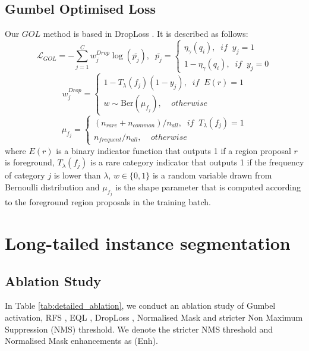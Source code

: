 \documentclass[runningheads]{llncs}
\begin{document}
\subsection{Gumbel Optimised Loss}
Our $GOL$ method is based in DropLoss \cite{hsieh2021droploss}. It is described as follows:
\begin{equation}
    \mathcal{L}_{GOL} = -\sum_{j=1}^{C}w_j^{Drop}\log(\bar{p_j}),\;\; \bar{p_j}=\begin{cases}
         \eta_{\gamma}(q_i),\;\; if \;\;  y_j=1\\
         1-\eta_{\gamma}(q_i),\;\;  if\;\;  y_j=0
        \end{cases}
\end{equation}
\begin{equation}
    w_j^{Drop}=\begin{cases}
         1- T_{\lambda}(f_j)(1-y_j),\;\; if \;\;  E(r)=1\\
         w \sim \text{Ber}(\mu_{f_j}),\;\;  \;\;  otherwise
        \end{cases}
\end{equation}
\begin{equation}
    \mu_{f_j}=\begin{cases}
         (n_{rare}+n_{common})/n_{all},\;\; if \;\;  T_{\lambda}(f_j)=1\\
         n_{frequent}/n_{all},\;\;  \;\;  otherwise
        \end{cases}
\end{equation}
where $E(r)$ is a binary indicator function that outputs 1 if a region proposal $r$ is foreground, $T_{\lambda}(f_j)$ is a rare category indicator that outputs 1 if the frequency of category $j$ is lower than $\lambda$, $w \in \{0,1\}$ is a random variable drawn from Bernoulli distribution and $\mu_{f_j}$ is the shape parameter that is computed according to the foreground region proposals in the training batch.



\section{Long-tailed instance segmentation}
\label{sec:ltis_supp}
\subsection{Ablation Study}
\label{sec:ablation_studies}
In Table \ref{tab:detailed_ablation}, we conduct an ablation study of Gumbel activation, RFS \cite{gupta2019lvis}, EQL \cite{tan2020equalization}, DropLoss \cite{hsieh2021droploss}, Normalised Mask \cite{wang2021seesaw} and stricter Non Maximum Suppression (NMS) threshold. We denote the stricter NMS threshold and Normalised Mask enhancements as (Enh).
\end{document}
